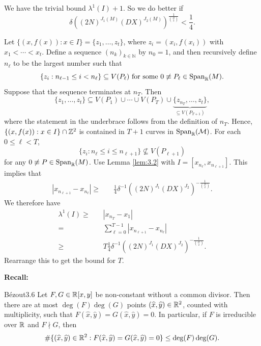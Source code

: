 \documentclass{Vorlesungstemplate_English} %
\newcommand{\Nzero}{\mathbb{N}}
\begin{document}
 We have the trivial bound $\lambda^1(I)+1$. So we do better if
\[ \delta((2N)^{J_1(M)}(DX)^{J_2(M)})^{\frac{1}{\binom{D}{2}}} < \frac{1}{4}.\]
\begin{pf}
  Let $\{ (x,f(x)): x \in I\} = \{ z_1, \dots, z_t\}$, where $z_i = (x_i, f(x_i))$ with $x_1 < \cdots < x_t$. Define a sequence $(n_k)_{k \in \Nzero}$ by $n_0 = 1$, and then recursively define $n_{\ell}$ to be the largest number such that
  \[ \{ z_i: n_{\ell-1} \leq i < n_{\ell}\} \subseteq V(P_{\ell}) \text{ for some } 0 \not\equiv P_{\ell} \in \text{Span}_{\mathbb{R}}(M).\]
  Suppose that the sequence terminates at $n_T$. Then
  \[ \{ z_1, \dots, z_t\} \subseteq V(P_1) \cup \cdots \cup V(P_T) \cup \underbrace{\{ z_{n_T} , \dots, z_t\}}_{\subseteq V(P_{T+1})},\]
  where the statement in the underbrace follows from the definition of $n_T$. Hence, $\{ (x, f(x)): x \in I\} \cap \mathbb{Z}^2$ is contained in $T+1$ curves in $\text{Span}_{\mathbb{R}}(\mathcal{M})$. For each $0 \leq \ell < T$,
  \[ \{ z_i: n_{\ell} \leq i \leq n_{\ell+1}\} \not\subseteq V(P_{\ell+1})\]
  for any $0 \not\equiv P \in \text{Span}_{\mathbb{R}}(M)$. Use Lemma \ref{lem:3.2} with $ I = [x_{n_{\ell}}, x_{n_{\ell+1}}]$. This implies that
  \begin{align*}
    |x_{n_{\ell+1}}-x_{n_{\ell}}| \geq \quad & \frac{1}{4}\delta^{-1}((2N)^{J_1}(DX)^{J_2})^{-\frac{1}{\binom{D}{2}}}.
  \end{align*}
  We therefore have
  \begin{align*}
    \lambda^1(I) \geq \quad & |x_{n_T}-x_1| \\
    = \quad & \sum_{\ell=0}^{T-1}|x_{n_{\ell+1}}-x_{n_{\ell}}| \\
    \geq \quad & T\frac{1}{4}\delta^{-1}((2N)^{J_1}(DX)^{J_2})^{-\frac{1}{\binom{D}{2}}}.
  \end{align*}
  Rearrange this to get the bound for $T$.
\end{pf}
\noindent \textbf{Recall:}
\begin{theorem}{Bézout}{3.6}
  Let $F, G \in \mathbb{R}[x,y]$ be non-constant without a common divisor. Then there are at most $\deg(F)\deg(G)$ points $(\widehat{x},\widehat{y}) \in \mathbb{R}^2$, counted with multiplicity, such that $F(\widehat{x},\widehat{y}) = G(\widehat{x},\widehat{y}) = 0$. In particular, if $F$ is irreducible over $\mathbb{R}$ and $F \nmid G$, then
  \[ \#\{ (\widehat{x},\widehat{y}) \in \mathbb{R}^2: F(\widehat{x},\widehat{y}) = G(\widehat{x},\widehat{y}) = 0\} \leq \deg(F)\deg(G).\]
\end{theorem}
\end{document}
